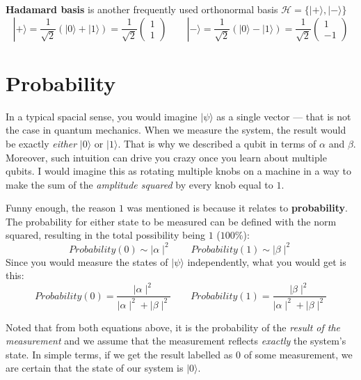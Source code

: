 \textbf{Hadamard basis} is another frequently used orthonormal basis $\mathcal{H} = \{|+\rangle, |-\rangle\}$
\begin{equation}
    |+\rangle
        = \frac{1}{\sqrt{2}}(|0\rangle+|1\rangle)
        = \frac{1}{\sqrt{2}}\begin{pmatrix} 1 \\ 1 \end{pmatrix}
    \qquad
    |-\rangle
        = \frac{1}{\sqrt{2}}(|0\rangle-|1\rangle)
        = \frac{1}{\sqrt{2}}\begin{pmatrix} 1 \\ -1 \end{pmatrix}
\end{equation}

\section{Probability}
In a typical spacial sense, you would imagine $|\psi\rangle$ as a single vector — that is not the case in quantum mechanics. When we measure the system, the result would be exactly \textit{either} $|0\rangle$ or $|1\rangle$. That is why we described a qubit in terms of $\alpha$ and $\beta$. Moreover, such intuition can drive you crazy once you learn about multiple qubits. I would imagine this as rotating multiple knobs on a machine in a way to make the sum of the \textit{amplitude squared} by every knob equal to $1$. 

Funny enough, the reason $1$ was mentioned is because it relates to \textbf{probability}. The probability for either state to be measured can be defined with the norm squared, resulting in the total possibility being $1$ ($100\%$):
\begin{equation}
    Probability(0) \sim \mid\alpha\mid^2
    \qquad
    Probability(1) \sim \mid\beta\mid^2
\end{equation}
Since you would measure the states of $|\psi\rangle$ independently, what you would get is this:
\begin{equation}
    Probability(0) = \frac{\mid\alpha\mid^2}{\mid\alpha\mid^2 + \mid\beta\mid^2}
    \qquad
    Probability(1) = \frac{\mid\beta\mid^2}{\mid\alpha\mid^2 + \mid\beta\mid^2}
\end{equation}

Noted that from both equations above, it is the probability of the \textit{result of the measurement} and we assume that the measurement reflects \textit{exactly} the system's state. In simple terms, if we get the result labelled as $0$ of some measurement, we are certain that the state of our system is $|0\rangle$.

